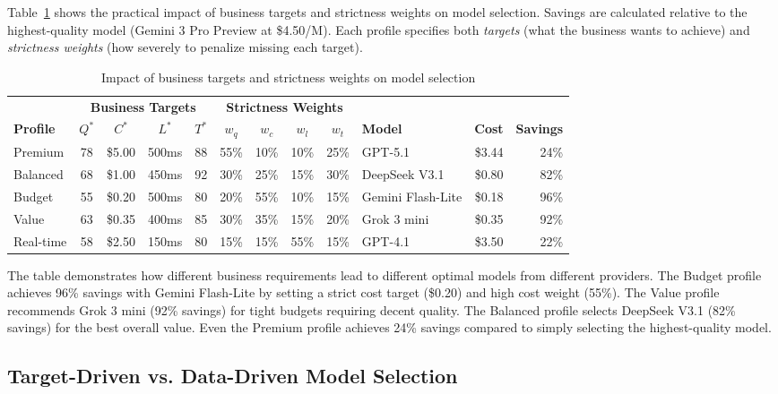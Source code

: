 \documentclass[11pt,a4paper]{article}
\begin{document}
Table~\ref{tab:weight-impact} shows the practical impact of business targets and strictness weights on model selection. Savings are calculated relative to the highest-quality model (Gemini 3 Pro Preview at \$4.50/M). Each profile specifies both \textit{targets} (what the business wants to achieve) and \textit{strictness weights} (how severely to penalize missing each target).

\begin{table}[h]
\centering
\caption{Impact of business targets and strictness weights on model selection}
\label{tab:weight-impact}
\small
\begin{tabular}{@{}l|cccc|cccc|lrr@{}}
\toprule
& \multicolumn{4}{c|}{\textbf{Business Targets}} & \multicolumn{4}{c|}{\textbf{Strictness Weights}} & & & \\
\textbf{Profile} & $Q^*$ & $C^*$ & $L^*$ & $T^*$ & $w_q$ & $w_c$ & $w_l$ & $w_t$ & \textbf{Model} & \textbf{Cost} & \textbf{Savings} \\
\midrule
Premium & 78 & \$5.00 & 500ms & 88 & 55\% & 10\% & 10\% & 25\% & GPT-5.1 & \$3.44 & 24\% \\
Balanced & 68 & \$1.00 & 450ms & 92 & 30\% & 25\% & 15\% & 30\% & DeepSeek V3.1 & \$0.80 & 82\% \\
Budget & 55 & \$0.20 & 500ms & 80 & 20\% & 55\% & 10\% & 15\% & Gemini Flash-Lite & \$0.18 & 96\% \\
Value & 63 & \$0.35 & 400ms & 85 & 30\% & 35\% & 15\% & 20\% & Grok 3 mini & \$0.35 & 92\% \\
Real-time & 58 & \$2.50 & 150ms & 80 & 15\% & 15\% & 55\% & 15\% & GPT-4.1 & \$3.50 & 22\% \\
\bottomrule
\end{tabular}
\end{table}

The table demonstrates how different business requirements lead to different optimal models from different providers. The Budget profile achieves 96\% savings with Gemini Flash-Lite by setting a strict cost target (\$0.20) and high cost weight (55\%). The Value profile recommends Grok 3 mini (92\% savings) for tight budgets requiring decent quality. The Balanced profile selects DeepSeek V3.1 (82\% savings) for the best overall value. Even the Premium profile achieves 24\% savings compared to simply selecting the highest-quality model.

\subsection{Target-Driven vs. Data-Driven Model Selection}
\label{sec:target_driven}
\end{document}
